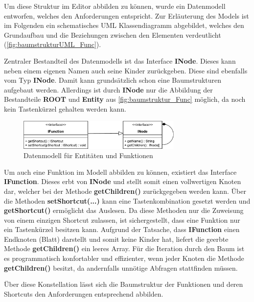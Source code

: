 Um diese Struktur im Editor abbilden zu können, wurde ein Datenmodell entworfen, welches den Anforderungen entspricht. Zur Erläuterung des Models ist im Folgenden ein schematisches UML Klassendiagramm abgebildet, welches den Grundaufbau und die Beziehungen zwischen den Elementen verdeutlicht (\autoref{fig:baumstrukturUML_Func}).

\vfill

Zentraler Bestandteil des Datenmodells ist das Interface \textbf{INode}. Dieses kann neben einem eigenen Namen auch seine Kinder zurückgeben. Diese sind ebenfalls vom Typ \textbf{INode}. Damit kann grundsätzlich schon eine Baumstrukturen aufgebaut werden. Allerdings ist durch \textbf{INode} nur die Abbildung der Bestandteile \textbf{ROOT} und \textbf{Entity} aus \autoref{fig:baumstruktur_Func} möglich, da noch kein Tastenkürzel gehalten werden kann.

\vfill

\begin{figure}[H]
	\vspace{20px}
	\centering
	\includegraphics[height=57px]{../graphic/diagrams/CD_Baumstruktur_Functions/Baumstruktur}
	\caption{Datenmodell für Entitäten und Funktionen}
	\label{fig:baumstrukturUML_Func}
\end{figure}

\vfill

Um auch eine Funktion im Modell abbilden zu können, existiert das Interface \textbf{IFunction}. Dieses erbt von \textbf{INode} und stellt somit einen vollwertigen Knoten dar, welcher bei der Methode \textbf{getChildren()} zurückgegeben werden kann. Über die Methoden \textbf{setShortcut(...)} kann eine Tastenkombination gesetzt werden und \textbf{getShortcut()} ermöglicht das Auslesen. Da diese Methoden nur die Zuweisung von einem einzigen Shortcut zulassen, ist sichergestellt, dass eine Funktion nur ein Tastenkürzel besitzen kann. Aufgrund der Tatsache, dass \textbf{IFunction} einen Endknoten (Blatt) darstellt und somit keine Kinder hat, liefert die geerbte Methode \textbf{getChildren()} ein leeres Array. Für die Iteration durch den Baum ist es programmatisch konfortabler und effizienter, wenn jeder Knoten die Methode \textbf{getChildren()} besitzt, da andernfalls unnötige Abfragen stattfinden müssen.

Über diese Konstellation lässt sich die Baumstruktur der Funktionen und deren Shortcuts den Anforderungen entsprechend abbilden.

